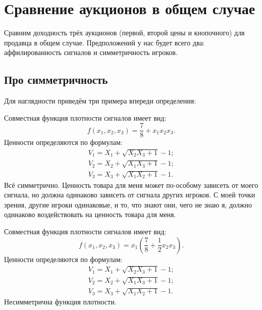 \chapter{Сравнение аукционов в общем случае}



Сравним доходность трёх аукционов (первой, второй цены и кнопочного) для продавца в общем случае. Предположений у нас будет всего два: аффилированность сигналов и симметричность игроков.

\section{Про симметричность}
Для наглядности приведём три примера впереди определения:

\begin{myex} Совместная функция плотности сигналов имеет вид:
\begin{equation}
f(x_{1},x_{2},x_{3})=\frac{7}{8}+x_{1}x_{2}x_{3}.
\end{equation}
Ценности определяются по формулам:
\begin{equation}
\begin{array}{c}
V_{1}=X_{1}+\sqrt{X_{2}X_{3}+1}-1; \\
V_{2}=X_{2}+\sqrt{X_{1}X_{3}+1}-1; \\
V_{3}=X_{3}+\sqrt{X_{1}X_{2}+1}-1.
\end{array}
\end{equation}
Всё симметрично. Ценность товара для меня может по-особому зависеть от моего сигнала, но должна одинаково зависеть от сигнала других игроков. С моей точки зрения, другие игроки одинаковые, и то, что знают они, чего не знаю я, должно одинаково воздействовать на ценность товара для меня.
\end{myex}


\begin{myex} Совместная функция плотности сигналов имеет вид:
\begin{equation}
f(x_{1},x_{2},x_{3})=
x_{1}\left(\frac{7}{8}+\frac{1}{2}x_{2}x_{3}\right).
\end{equation}
Ценности определяются по формулам:
\begin{equation}
\begin{array}{c}
V_{1}=X_{1}+\sqrt{X_{2}X_{3}+1}-1; \\
V_{2}=X_{2}+\sqrt{X_{1}X_{3}+1}-1; \\
V_{3}=X_{3}+\sqrt{X_{1}X_{2}+1}-1.
\end{array}
\end{equation}
Несимметрична функция плотности.
\end{myex}

